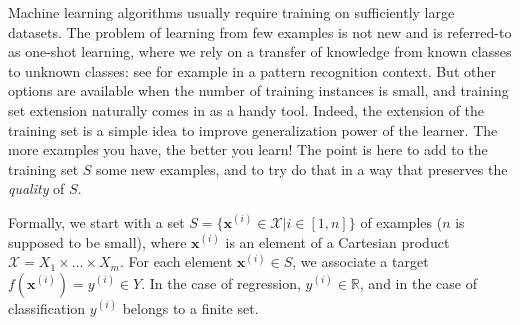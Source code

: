 Machine learning algorithms usually require training on sufficiently large
datasets. The problem of learning from few examples is not new and is
referred-to as one-shot learning, where we rely on a transfer of knowledge from
known classes to unknown classes: see  for example \cite{LiFerPerPAMI06} in a
pattern recognition context.  But other options are available when the number
of training instances is small, and training set extension naturally comes in
as a handy tool. Indeed, the extension of the training set is a simple idea to
improve generalization power of the learner.  The more examples you have, the
better you learn! The point is here to add to the training set $S$ some new
examples, and to try do that in a way that preserves the \textit{quality} of
$S$.

Formally, we start with a set $S= \{\mathbf{x}^{(i)} \in \mathcal{X}| i \in
[1,n]\}$ of examples ($n$ is supposed to be small), where $\mathbf{x}^{(i)}$ is
an element of a Cartesian product $\mathcal{X} = X_1 \times \ldots \times X_m$.
For each element  $\mathbf{x}^{(i)} \in S$, we associate a target
$f(\mathbf{x}^{(i)})=y^{(i)} \in Y$.  In the case of regression, $y^{(i)} \in
\mathbb{R}$, and in the case of classification $y^{(i)}$ belongs to a finite
set.


